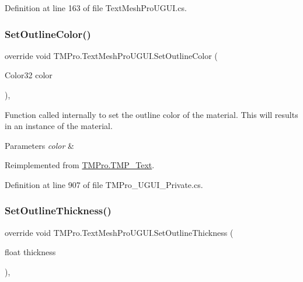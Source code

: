 Definition at line 163 of file Text\+Mesh\+Pro\+U\+G\+U\+I.\+cs.

\mbox{\label{class_t_m_pro_1_1_text_mesh_pro_u_g_u_i_ab6bfded8873a3c3aea4639932ec6f4b7}} 
\subsubsection{\texorpdfstring{SetOutlineColor()}{SetOutlineColor()}}
{\footnotesize\ttfamily override void T\+M\+Pro.\+Text\+Mesh\+Pro\+U\+G\+U\+I.\+Set\+Outline\+Color (\begin{DoxyParamCaption}\item[{Color32}]{color }\end{DoxyParamCaption})\hspace{0.3cm}{\ttfamily [protected]}, {\ttfamily [virtual]}}



Function called internally to set the outline color of the material. This will results in an instance of the material. 


\begin{DoxyParams}{Parameters}
{\em color} & \\
\hline
\end{DoxyParams}


Reimplemented from \mbox{\hyperlink{class_t_m_pro_1_1_t_m_p___text_a726c0894801737f281ecf5656e9ee4d0}{T\+M\+Pro.\+T\+M\+P\+\_\+\+Text}}.



Definition at line 907 of file T\+M\+Pro\+\_\+\+U\+G\+U\+I\+\_\+\+Private.\+cs.

\mbox{\label{class_t_m_pro_1_1_text_mesh_pro_u_g_u_i_a2f3dda7925344d1798b83d85e8c81361}} 
\subsubsection{\texorpdfstring{SetOutlineThickness()}{SetOutlineThickness()}}
{\footnotesize\ttfamily override void T\+M\+Pro.\+Text\+Mesh\+Pro\+U\+G\+U\+I.\+Set\+Outline\+Thickness (\begin{DoxyParamCaption}\item[{float}]{thickness }\end{DoxyParamCaption})\hspace{0.3cm}{\ttfamily [protected]}, {\ttfamily [virtual]}}



